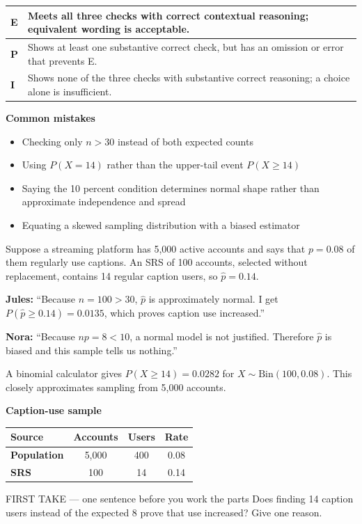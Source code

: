 \documentclass[11pt]{article}
\begin{document}
{\small\renewcommand{\arraystretch}{1.25}
\noindent\begin{tabular}{|p{0.5in}|p{5.9in}|}
\hline
\textbf{E} & Meets all three checks with correct contextual reasoning; equivalent wording is acceptable. \\ \hline
\textbf{P} & Shows at least one substantive correct check, but has an omission or error that prevents E. \\ \hline
\textbf{I} & Shows none of the three checks with substantive correct reasoning; a choice alone is insufficient. \\ \hline
\end{tabular}}

\textbf{Common mistakes}
\begin{itemize}[leftmargin=1.5em,itemsep=2pt,topsep=2pt]
  \item Checking only $n>30$ instead of both expected counts
  \item Using $P(X=14)$ rather than the upper-tail event $P(X\geq14)$
  \item Saying the 10 percent condition determines normal shape rather than approximate independence and spread
  \item Equating a skewed sampling distribution with a biased estimator
\end{itemize}

\clearpage
{}

Suppose a streaming platform has 5,000 active accounts and says that $p=0.08$ of them regularly use captions. An SRS of 100 accounts, selected without replacement, contains 14 regular caption users, so $\widehat p=0.14$.\par\smallskip \textbf{Jules:} ``Because $n=100>30$, $\widehat p$ is approximately normal. I get $P(\widehat p\geq0.14)=0.0135$, which proves caption use increased.''\par \textbf{Nora:} ``Because $np=8<10$, a normal model is not justified. Therefore $\widehat p$ is biased and this sample tells us nothing.''\par\smallskip A binomial calculator gives $P(X\geq14)=0.0282$ for $X\sim\mathrm{Bin}(100,0.08)$. This closely approximates sampling from 5,000 accounts.\par
\begin{center}
\textbf{Caption-use sample}\par\smallskip
\begin{tabular}{|l|c|c|c|}
\hline
\textbf{Source} & \textbf{Accounts} & \textbf{Users} & \textbf{Rate} \\ \hline
\textbf{Population} & 5,000 & 400 & 0.08 \\ \hline
\textbf{SRS} & 100 & 14 & 0.14 \\ \hline
\end{tabular}
\end{center}
\begin{firsttakebox}{FIRST TAKE --- one sentence before you work the parts}
Does finding 14 caption users instead of the expected 8 prove that use increased? Give one reason.\par
{}
\end{firsttakebox}
\end{document}
